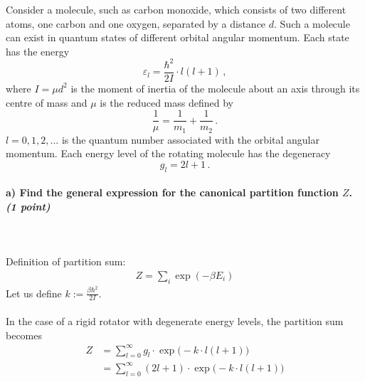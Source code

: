 Consider a molecule, such as carbon monoxide, which consists of two 
different atoms, one carbon and one oxygen, separated by a distance $d$. 
Such a molecule can exist in quantum states of different orbital angular 
momentum. Each state has the energy
\begin{equation}
    \varepsilon_l=\frac{\hbar^2}{2I}\cdot l(l+1) \,,
\end{equation}
where $I=\mu d^2$ is the moment of inertia of the molecule about an axis 
through its centre of mass and $\mu$ is the reduced mass defined by 
\begin{equation}
    \frac{1}{\mu}=\frac{1}{m_1}+\frac{1}{m_2} \,.
\end{equation}
$l=0,1,2,...$ is the quantum number associated with the orbital angular 
momentum. Each energy level of the rotating molecule has the degeneracy
\begin{equation}
    g_l=2l+1 \,.
\end{equation}

\paragraph{a) Find the general expression for the canonical partition 
    function $Z$. \textit{(1 point)}
} \ \\
\\
    Definition of partition sum:
    \begin{align}
        Z=\sum_i\exp(-\beta E_i)
    \end{align}
    Let us define $k:=\frac{\beta\hbar^2}{2I}$. \\
    \\
    In the case of 
    a rigid rotator with degenerate energy levels, the partition sum becomes
    \begin{align}
        Z
        &=\sum_{l=0}^\infty g_l\cdot\exp\bigg(
            -k\cdot l(l+1)
        \bigg) \\
        &=\sum_{l=0}^\infty(2l+1)\cdot\exp\bigg(
            -k\cdot l(l+1)
        \bigg)
    \end{align}

